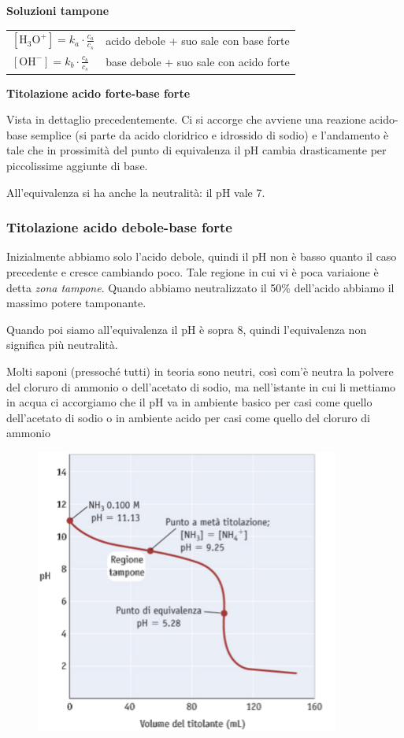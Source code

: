 \textbf{Soluzioni tampone}

\begin{center}
    \begin{tabular}{p{5cm}p{8cm}}
        $[\text{H}_3\text{O}^+]=k_a \cdot \displaystyle \frac{c_a}{c_s}$ & acido debole + suo sale con base forte\\[2ex]
        $[\text{OH}^-]=k_b \cdot \displaystyle \frac{c_b}{c_s}$ & base debole + suo sale con acido forte
    \end{tabular}   
\end{center}

\textbf{Titolazione acido forte-base forte}

Vista in dettaglio precedentemente. Ci si accorge che avviene una reazione acido-base semplice (si parte da acido cloridrico e idrossido di sodio) e l'andamento è tale che in prossimità del punto di equivalenza il pH cambia drasticamente per piccolissime aggiunte di base.

All'equivalenza si ha anche la neutralità: il pH vale 7.

\subsubsection{Titolazione acido debole-base forte}
Inizialmente abbiamo solo l'acido debole, quindi il pH non è basso quanto il caso precedente e cresce cambiando poco. Tale regione in cui vi è poca variaione è detta \textit{zona tampone}. Quando abbiamo neutralizzato il 50\% dell'acido abbiamo il massimo potere tamponante.

Quando poi siamo all'equivalenza il pH è sopra 8, quindi l'equivalenza non significa più neutralità.

Molti saponi (pressoché tutti) in teoria sono neutri, così com'è neutra la polvere del cloruro di ammonio o dell'acetato di sodio, ma nell'istante in cui li mettiamo in acqua ci accorgiamo che il pH va in ambiente basico per casi come quello dell'acetato di sodio o in ambiente acido per casi come quello del cloruro di ammonio

\begin{figure}[H]
    \centering
    \includegraphics[width=10cm]{immagini/titolazione_base_forte_acido_debole.png}
\end{figure}


